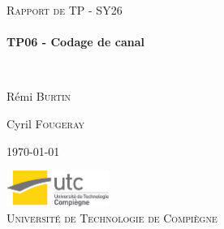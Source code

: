 \begin{titlepage}
\begin{center}



\textsc{\Large Rapport de TP - SY26}\\[0.5cm]
\vspace{4cm}
\HRule \\[0.4cm]
{ \huge \bfseries TP06 - Codage de canal \\[0.4cm] }

\HRule \\[1.5cm]

\begin{minipage}{0.4\textwidth}
\begin{flushleft} \large
R\'emi \textsc{Burtin}
\end{flushleft}
\end{minipage}
\begin{minipage}{0.4\textwidth}
\begin{flushright} \large
Cyril \textsc{Fougeray}
\end{flushright}
\end{minipage}

\vspace{4cm}

{\large \today}



\vfill
\includegraphics[width=0.25\textwidth]{logo.jpg}\\[0.5cm]

\textsc{\LARGE Universit\'{e} de Technologie de Compi\`{e}gne}\\[1.5cm]


\end{center}
\end{titlepage}
